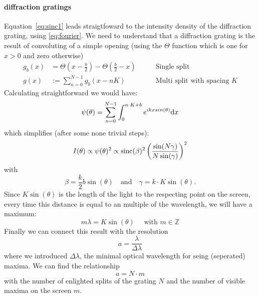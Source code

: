 \paragraph{diffraction gratings} 
Equation~\eqref{eq:sinc1} leads straigtfoward to the intensity density of
the diffraction grating, using \eqref{eq:fourier}. We need to understand 
that a diffraction grating is the result of convoluting of a simple opening
(using the $\Theta$ function which is one for $x>0$ and zero otherwise)
\begin{align}
    \label{eq:multisplit}
    g_b(x) &= \Theta(x - \frac{b}{2}) - \Theta( \frac{b}{2} - x ) \qquad
           &\text{Single split} \\ 
   g(x)   &:= \sum_{n=0}^{N-1} g_b(x-nK) 
         \qquad &\text{Multi split with spacing } K
\end{align}
Calculating straightforward we would have:
\begin{equation}
    \psi(\theta) = \sum_{n = 0}^{N-1}  \int^{n \cdot K + b}_{0} e^{i k x sin(\theta)} \mathrm{d} x
\end{equation}
which simplifies (after some none trivial steps):
\begin{equation}
    I(\theta) \propto \psi(\theta)^2 \propto \mathrm{sinc}(\beta)^2 \left (\frac{\sin(N\gamma)}{N \sin(\gamma)}\right )^2
\end{equation}
with
\begin{equation}
    \beta = \frac{k}{2}b \sin(\theta) \quad \text{and} \quad \gamma = k\cdot K \sin(\theta).
\end{equation}
Since $K \sin (\theta)$ is the length of the light to the respecting point on the screen, every time
this distance is equal to an multiple of the wavelength, we will have a maximum:
\begin{equation}
    m \lambda = K \sin(\theta) \quad \text{ with }m \in \mathbb{Z}
    \label{eq:N_lines_interference}
\end{equation}
Finally we can connect this result with the resolution
\begin{equation}
    a = \frac{\lambda}{\Delta \lambda}
\end{equation}
where we introduced $\Delta \lambda$, the minimal optical wavelength for seing
(seperated) maxima. We can find the relationship
\begin{equation}
    a = N \cdot m
    \label{eq:resolution}
\end{equation}
with the number of enlighted splits of the grating $N$ and the number of 
visible maxima on the screen $m$.
\clearpage
